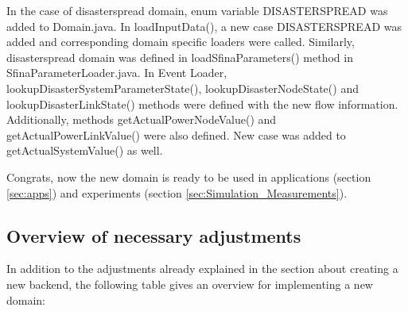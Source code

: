 \documentclass[11pt,fleqn]{book} %
\begin{document}
In the case of disaster\textunderscore spread domain, enum variable DISASTERSPREAD was added to Domain.java. In loadInputData(), a new case DISASTERSPREAD was added and corresponding domain specific loaders were called. Similarly, disaster\textunderscore spread domain was defined in loadSfinaParameters() method in SfinaParameterLoader.java. In Event Loader, lookupDisasterSystemParameterState(), lookupDisasterNodeState() and lookupDisasterLinkState() methods were defined with the new flow information. Additionally, methods getActualPowerNodeValue() and getActualPowerLinkValue() were also defined. New case was added to getActualSystemValue() as well.

Congrats, now the new domain is ready to be used in applications (section \ref{sec:apps}) and experiments (section \ref{sec:Simulation_Measurements}).

\subsection{Overview of necessary adjustments}
In addition to the adjustments already explained in the section about creating a new backend, the following table gives an overview for implementing a new domain:
\end{document}
